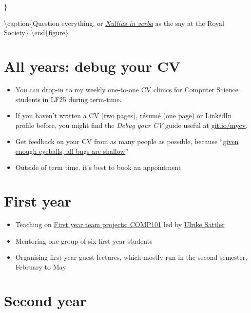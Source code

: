 \documentclass[12pt,]{book}
\providecommand{\tightlist}{%
  \setlength{\itemsep}{0pt}\setlength{\parskip}{0pt}}
\begin{document}
\}

\textbackslash{}caption\{Question everything, or \emph{\href{https://en.wikipedia.org/wiki/Nullius_in_verba}{Nullius in verba}} as the say at the Royal Society\}\label{fig:unnamed-chunk-2}
\textbackslash{}end\{figure\}

\hypertarget{all-years-debug-your-cv}{%
\section{All years: debug your CV}\label{all-years-debug-your-cv}}

\begin{itemize}
\tightlist
\item
  You can drop-in to my weekly one-to-one CV clinics for Computer Science students in LF25 during term-time.
\item
  If you haven't written a CV (two pages), résumé (one page) or LinkedIn profile before, you might find the \emph{Debug your CV} guide useful at \href{http://git.io/mycv}{git.io/mycv}.
\item
  Get feedback on your CV from as many people as possible, because ``\href{https://en.wikipedia.org/wiki/Linus\%27s_Law}{given enough eyeballs, all bugs are shallow}''
\item
  Outside of term time, it's best to book an appointment
\end{itemize}

\hypertarget{first-year}{%
\section{First year}\label{first-year}}

\begin{itemize}
\tightlist
\item
  Teaching on \href{https://studentnet.cs.manchester.ac.uk/ugt/COMP10120/syllabus/}{First year team projects: COMP101} led by \href{http://www.cs.man.ac.uk/~sattler/}{Ulrike Sattler}
\item
  Mentoring one group of six first year students
\item
  Organising first year guest lectures, which mostly run in the second semester, February to May
\end{itemize}

\hypertarget{second-year}{%
\section{Second year}\label{second-year}}
\end{document}
